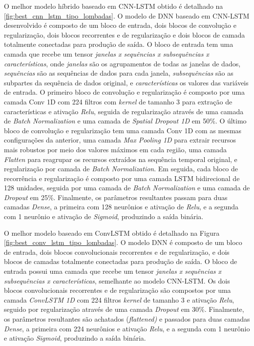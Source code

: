 O melhor modelo híbrido baseado em CNN-LSTM obtido é detalhado na \autoref{fig:best_cnn_lstm_tipo_lombadas}. O modelo de DNN baseado em CNN-LSTM desenvolvido é composto de um bloco de entrada, dois blocos de convolução e regularização, dois blocos recorrentes e de regularização e dois blocos de camada totalmente conectadas para produção de saída. O bloco de entrada tem uma camada que recebe um tensor \emph{janelas x sequências x subsequências x características}, onde \emph{janelas} são os agrupamentos de todas as janelas de dados, \emph{sequências} são as sequências de dados para cada janela, \emph{subsequências} são as subpartes da sequência de dados original, e \emph{características} os valores das variáveis de entrada. O primeiro bloco de convolução e regularização é composto por uma camada Conv 1D com 224 filtros com  \textit{kernel} de tamanho 3 para extração de características e ativação \textit{Relu}, seguida de regularização através de uma camada de \textit{Batch Normalization} e uma camada de \textit{Spatial Dropout 1D} em 50\%. O último bloco de convolução e regularização tem uma camada Conv 1D com as mesmas configurações da anterior, uma camada \textit{Max Pooling 1D} para extrair recursos mais robustos por meio dos valores máximos em cada região, uma camada \textit{Flatten} para reagrupar os recursos extraídos na sequência temporal original, e regularização por camada de \textit{Batch Normalization}. Em seguida, cada bloco de recorrência e regularização é composto por uma camada LSTM bidirecional de 128 unidades, seguida por uma camada de \textit{Batch Normalization} e uma camada de \textit{Dropout} em 25\%. Finalmente, os parâmetros resultantes passam para duas camadas \textit{Dense}, a primeira com 128 neurônios e ativação de \textit{Relu}, e a segunda com 1 neurônio e ativação de \textit{Sigmoid}, produzindo a saída binária. 

O melhor modelo baseado em ConvLSTM obtido é detalhado na Figura \autoref{fig:best_conv_lstm_tipo_lombadas}. O modelo DNN é composto de um bloco de entrada, dois blocos convolucionais recorrentes e de regularização, e dois blocos de camadas totalmente conectadas para produção de saída. O bloco de entrada possui uma camada que recebe um tensor \emph{janelas x sequências x subsequências x características}, semelhante ao modelo CNN-LSTM. Os dois blocos convolucionais recorrentes e de regularização são compostos por uma camada \textit{ConvLSTM 1D} com 224 filtros \textit{kernel} de tamanho 3 e ativação \textit{Relu}, seguido por regularização através de uma camada \textit{Dropout} em 30\%. Finalmente, os parâmetros resultantes são achatados (\textit{flattened)} e passados para duas camadas \textit{Dense}, a primeira com 224 neurônios e ativação \textit{Relu}, e a segunda com 1 neurônio e ativação \textit{Sigmoid}, produzindo a saída binária.

